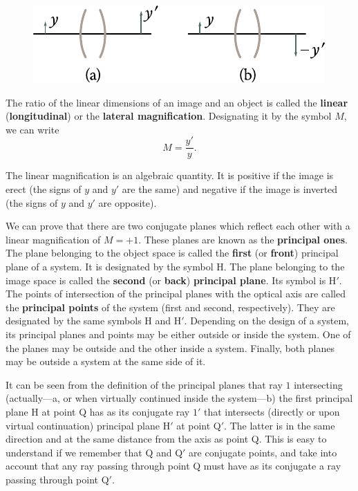 \begin{figure}[t]
	\begin{center}
		\includegraphics[scale=1]{figures/ch_16/fig_16_15.pdf}
        \caption[]{}
		\label{fig:16_15}
	\end{center}
	\vspace{-0.8cm}
\end{figure}

The ratio of the linear dimensions of an image and an object is called the \textbf{linear} (\textbf{longitudinal}) or the \textbf{lateral magnification}.
Designating it by the symbol $M$, we can write
\begin{equation}\label{eq:16_56}
    M = \frac{y'}{y}.
\end{equation}

\noindent
The linear magnification is an algebraic quantity.
It is positive if the image is erect (the signs of $y$ and $y'$ are the same) and negative if the image is inverted (the signs of $y$ and $y'$ are opposite).

We can prove that there are two conjugate planes which reflect each other with a linear magnification of $M=+1$.
These planes are known as the \textbf{principal ones}.
The plane belonging to the object space is called the \textbf{first} (or \textbf{front}) principal plane of a system.
It is designated by the symbol H. The plane belonging to the image space is called the \textbf{second} (or \textbf{back}) \textbf{principal plane}.
Its symbol is H$'$.
The points of intersection of the principal planes with the optical axis are called the \textbf{principal points} of the system (first and second, respectively).
They are designated by the same symbols H and H$'$.
Depending on the design of a system, its principal planes and points may be either outside or inside the system.
One of the planes may be outside and the other inside a system.
Finally, both planes may be outside a system at the same side of it.

It can be seen from the definition of the principal planes that ray $1$ intersecting (actually---a, or when virtually continued inside the system---b) the first principal plane H at point Q has as its conjugate ray $1'$ that intersects (directly or upon virtual continuation) principal plane H$'$ at point Q$'$.
The latter is in the same direction and at the same distance from the axis as point Q.
This is easy to understand if we remember that Q and Q$'$ are conjugate points, and take into account that any ray passing through point Q must
have as its conjugate a ray passing through point Q$'$.

